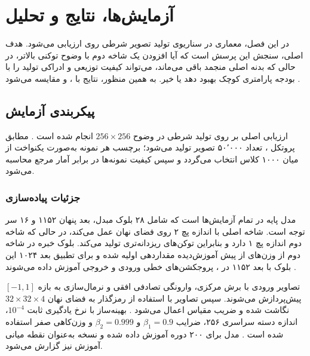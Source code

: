 \chapter{آزمایش‌ها، نتایج و تحلیل}
\label{ch:experiments}

در این فصل، معماری  در سناریوی تولید تصویر شرطی روی  ارزیابی می‌شود. هدف اصلی، سنجش این پرسش است که آیا افزودن یک شاخه دوم با وضوح توکنی بالاتر، در حالی که بدنه اصلی  منجمد باقی می‌ماند، می‌تواند کیفیت توزیعی و ادراکی تولید را با بودجه پارامتری کوچک بهبود دهد یا خیر. به همین منظور، نتایج  با ،  و  مقایسه می‌شود \cite{2212.09748,Yao2025LightningDiT,Pan2024FineDiffusion}.

\section{پیکربندی آزمایش}
ارزیابی اصلی بر روی تولید شرطی  در وضوح $256 \times 256$ انجام شده است \cite{5206848,imagenet15russakovsky}. مطابق پروتکل ، تعداد ۵۰٬۰۰۰ تصویر تولید می‌شود؛ برچسب هر نمونه به‌صورت یکنواخت از میان ۱۰۰۰ کلاس 
 انتخاب می‌گردد و سپس کیفیت نمونه‌ها در برابر آمار مرجع 
 محاسبه می‌شود. 
\subsection{جزئیات پیاده‌سازی}
مدل پایه در تمام آزمایش‌ها  است که شامل ۲۸ بلوک مبدل، بعد پنهان ۱۱۵۲ و ۱۶ سر توجه است. شاخه اصلی با اندازه پچ ۲ روی فضای نهان عمل می‌کند، در حالی که شاخه دوم  اندازه پچ ۱ دارد و بنابراین توکن‌های ریزدانه‌تری تولید می‌کند. بلوک خبره  در شاخه دوم از وزن‌های از پیش آموزش‌دیده  مقداردهی اولیه شده و برای تطبیق بعد ۱۰۲۴ این بلوک با بعد ۱۱۵۲ در ، پروجکشن‌های خطی ورودی و خروجی آموزش داده می‌شوند \cite{Dosovitskiy2020,wightman2019timm,2212.09748}.

تصاویر ورودی با برش مرکزی، وارونگی تصادفی افقی و نرمال‌سازی به بازه $[-1,1]$ پیش‌پردازش می‌شوند. سپس تصاویر با استفاده از رمزگذار  به فضای نهان $32 \times 32 \times 4$ نگاشت شده و ضریب مقیاس  اعمال می‌شود \cite{9851474}. بهینه‌ساز  با نرخ یادگیری ثابت $10^{-4}$، اندازه دسته سراسری ۲۵۶، ضرایب $\beta_1=0.9$ و $\beta_2=0.999$ و وزن‌کاهی صفر استفاده شده است \cite{loshchilov2019adamw}. مدل  برای ۲۰۰ دوره آموزش داده شده و نسخه  به‌عنوان نقطه میانی آموزش نیز گزارش می‌شود.

